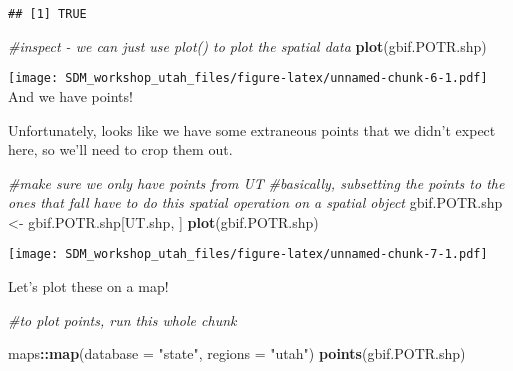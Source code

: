 \documentclass[]{article}
\newenvironment{Shaded}{\begin{snugshade}}{\end{snugshade}}
\newcommand{\KeywordTok}[1]{\textcolor[rgb]{0.13,0.29,0.53}{\textbf{#1}}}
\newcommand{\DataTypeTok}[1]{\textcolor[rgb]{0.13,0.29,0.53}{#1}}
\newcommand{\StringTok}[1]{\textcolor[rgb]{0.31,0.60,0.02}{#1}}
\newcommand{\CommentTok}[1]{\textcolor[rgb]{0.56,0.35,0.01}{\textit{#1}}}
\newcommand{\OtherTok}[1]{\textcolor[rgb]{0.56,0.35,0.01}{#1}}
\newcommand{\OperatorTok}[1]{\textcolor[rgb]{0.81,0.36,0.00}{\textbf{#1}}}
\newcommand{\NormalTok}[1]{#1}
\begin{document}
\begin{verbatim}
## [1] TRUE
\end{verbatim}

\begin{Shaded}
\begin{Highlighting}[]
\CommentTok{#inspect - we can just use plot() to plot the spatial data}
\KeywordTok{plot}\NormalTok{(gbif.POTR.shp)}
\end{Highlighting}
\end{Shaded}

\texttt{[image: SDM\_workshop\_utah\_files/figure-latex/unnamed-chunk-6-1.pdf]}
And we have points!

Unfortunately, looks like we have some extraneous points that we didn't
expect here, so we'll need to crop them out.

\begin{Shaded}
\begin{Highlighting}[]
\CommentTok{#make sure we only have points from UT}
\CommentTok{#basically, subsetting the points to the ones that fall  have to do this spatial operation on a spatial object}
\NormalTok{gbif.POTR.shp <-}\StringTok{ }\NormalTok{gbif.POTR.shp[UT.shp, ]}
\KeywordTok{plot}\NormalTok{(gbif.POTR.shp)}
\end{Highlighting}
\end{Shaded}

\texttt{[image: SDM\_workshop\_utah\_files/figure-latex/unnamed-chunk-7-1.pdf]}

\begin{Shaded}
\end{Shaded}

Let's plot these on a map!

\begin{Shaded}
\begin{Highlighting}[]
\CommentTok{#to plot points, run this whole chunk }

\NormalTok{maps}\OperatorTok{::}\KeywordTok{map}\NormalTok{(}\DataTypeTok{database =} \StringTok{"state"}\NormalTok{, }\DataTypeTok{regions =} \StringTok{"utah"}\NormalTok{)}
    \KeywordTok{points}\NormalTok{(gbif.POTR.shp)}
\end{Highlighting}
\end{Shaded}
\end{document}
